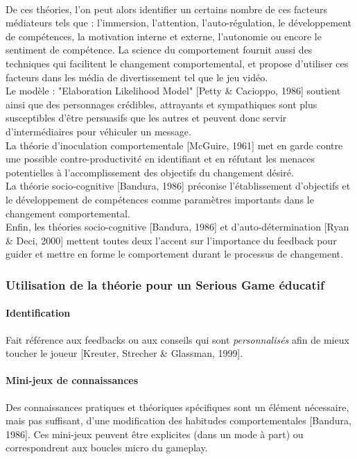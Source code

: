 \paragraph{}De ces théories, l’on peut alors identifier un certains nombre de ces facteurs médiateurs tels que : l’immersion, l’attention, l’auto-régulation, le développement de compétences, la motivation interne et externe, l’autonomie ou encore le sentiment de compétence. La science du comportement fournit aussi des techniques qui facilitent le changement comportemental, et propose d’utiliser ces facteurs dans les média de divertissement tel que le jeu vidéo.\\
Le modèle : "Elaboration Likelihood Model" [Petty \& Cacioppo, 1986] soutient ainsi que des personnages crédibles, attrayants et sympathiques sont plus susceptibles d’être persuasifs que les autres et peuvent donc servir d’intermédiaires pour véhiculer un message. \\
La théorie d’inoculation comportementale [McGuire, 1961] met en garde contre une possible contre-productivité en identifiant et en réfutant les menaces potentielles à l’accomplissement des objectifs du changement désiré.\\
La théorie socio-cognitive [Bandura, 1986] préconise l’établissement d’objectifs et le développement de compétences comme paramètres importants dans le changement comportemental.\\
Enfin, les théories socio-cognitive [Bandura, 1986] et d’auto-détermination [Ryan \& Deci, 2000] mettent toutes deux l’accent sur l’importance du feedback pour guider et mettre en forme le comportement durant le processus de changement.	

		\subsubsection*{Utilisation de la théorie pour un Serious Game éducatif}
			\paragraph{Identification \\ \quad}
Fait référence aux feedbacks ou aux conseils qui sont \emph{personnalisés} afin de mieux toucher le joueur [Kreuter, Strecher \& Glassman, 1999]. 
			\paragraph{Mini-jeux de connaissances \\ \quad}
Des connaissances pratiques et théoriques spécifiques sont un élément nécessaire, mais pas suffisant, d’une modification des habitudes comportementales [Bandura, 1986]. Ces mini-jeux peuvent être explicites (dans un mode à part) ou correspondrent aux boucles micro du gameplay.
